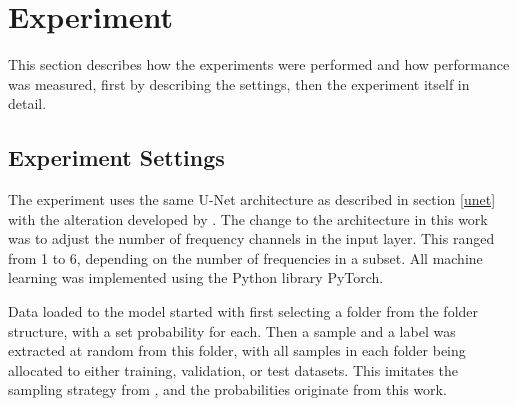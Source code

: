 \section{Experiment} \label{Experiment}
    This section describes how the experiments were performed and how performance was measured, first by describing the settings, then the experiment itself in detail.
    
    \subsection{Experiment Settings} \label{Experiment settings}
        The experiment uses the same U-Net architecture as described in section \ref{unet} with the alteration developed by \citeauthor{brautaset2020acoustic}\cite{brautaset2020acoustic}. The change to the architecture in this work was to adjust the number of frequency channels in the input layer. This ranged from 1 to 6, depending on the number of frequencies in a subset. All machine learning was implemented using the Python library PyTorch\cite{NEURIPS2019_9015}. %
        
        Data loaded to the model started with first selecting a folder from the folder structure, with a set probability for each. Then a sample and a label was extracted at random from this folder, with all samples in each folder being allocated to either training, validation, or test datasets. This imitates the sampling strategy from \citeauthor{brautaset2020acoustic}\cite{brautaset2020acoustic}, and the probabilities originate from this work.
        

